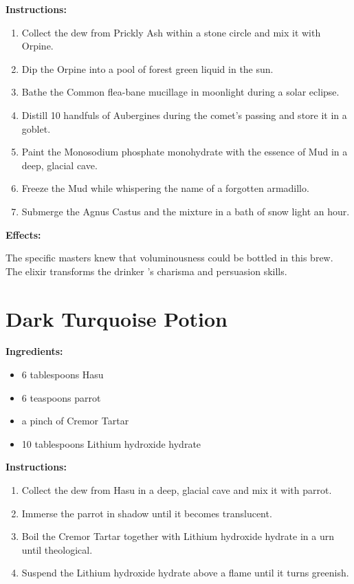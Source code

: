 \documentclass{article}
\begin{document}
\textbf{Instructions:}

\begin{enumerate}
  \item Collect the dew from Prickly Ash within a stone circle and mix it with Orpine.
  \item Dip the Orpine into a pool of forest green liquid in the sun.
  \item Bathe the Common flea-bane mucillage in moonlight during a solar eclipse.
  \item Distill 10 handfuls of Aubergines during the comet’s passing and store it in a goblet.
  \item Paint the Monosodium phosphate monohydrate with the essence of Mud in a deep, glacial cave.
  \item Freeze the Mud while whispering the name of a forgotten armadillo.
  \item Submerge the Agnus Castus and the mixture in a bath of snow light an hour.
\end{enumerate}

\textbf{Effects:}

The specific masters knew that voluminousness could be bottled in this brew. The elixir transforms the drinker 's charisma and persuasion skills.

\newpage
\section*{Dark Turquoise Potion}

\textbf{Ingredients:}

\begin{itemize}
  \item 6 tablespoons Hasu
  \item 6 teaspoons parrot
  \item a pinch of Cremor Tartar
  \item 10 tablespoons Lithium hydroxide hydrate
\end{itemize}

\textbf{Instructions:}

\begin{enumerate}
  \item Collect the dew from Hasu in a deep, glacial cave and mix it with parrot.
  \item Immerse the parrot in shadow until it becomes translucent.
  \item Boil the Cremor Tartar together with Lithium hydroxide hydrate in a urn until theological.
  \item Suspend the Lithium hydroxide hydrate above a flame until it turns greenish.
\end{enumerate}
\end{document}
